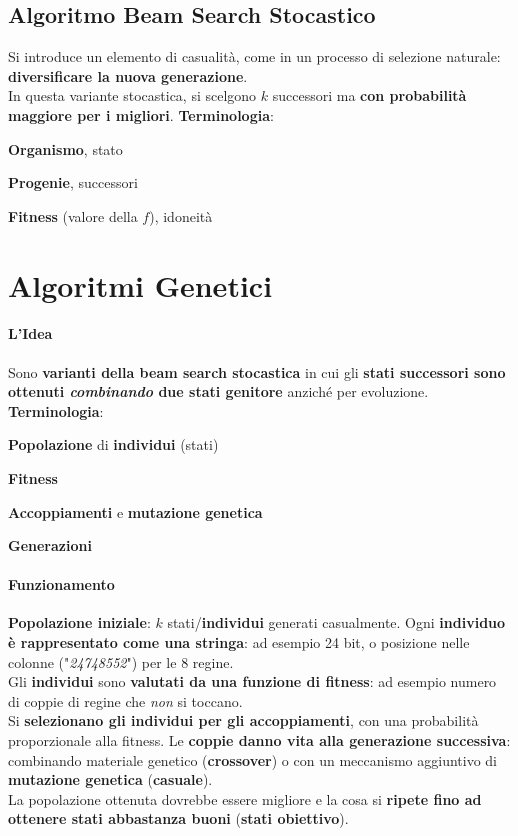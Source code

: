 \documentclass[10pt]{book}
\begin{document}
\subsection{Algoritmo Beam Search Stocastico}
Si introduce un elemento di casualità, come in un processo di selezione naturale: \textbf{diversificare la nuova generazione}.\\
In questa variante stocastica, si scelgono $k$ successori ma \textbf{con probabilità maggiore per i migliori}. \textbf{Terminologia}:
\begin{list}{}{}
	\item \textbf{Organismo}, stato
	\item \textbf{Progenie}, successori
	\item \textbf{Fitness} (valore della $f$), idoneità
\end{list}
\section{Algoritmi Genetici}
\paragraph{L'Idea} Sono \textbf{varianti della beam search stocastica} in cui gli \textbf{stati successori sono ottenuti \textit{combinando} due stati genitore} anziché per evoluzione. \textbf{Terminologia}:
\begin{list}{}{}
	\item \textbf{Popolazione} di \textbf{individui} (stati)
	\item \textbf{Fitness}
	\item \textbf{Accoppiamenti} e \textbf{mutazione genetica}
	\item \textbf{Generazioni}
\end{list}
\paragraph{Funzionamento} \textbf{Popolazione iniziale}: $k$ stati/\textbf{individui} generati casualmente. Ogni \textbf{individuo è rappresentato come una stringa}: ad esempio 24 bit, o posizione nelle colonne ("\textit{24748552}") per le 8 regine.\\
Gli \textbf{individui} sono \textbf{valutati da una funzione di fitness}: ad esempio numero di coppie di regine che \textit{non} si toccano.\\
Si \textbf{selezionano gli individui per gli accoppiamenti}, con una probabilità proporzionale alla fitness. Le \textbf{coppie danno vita alla generazione successiva}: combinando materiale genetico (\textbf{crossover}) o con un meccanismo aggiuntivo di \textbf{mutazione genetica} (\textbf{casuale}).\\
La popolazione ottenuta dovrebbe essere migliore e la cosa si \textbf{ripete fino ad ottenere stati abbastanza buoni} (\textbf{stati obiettivo}).
\end{document}
